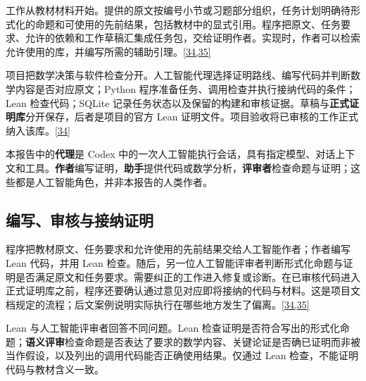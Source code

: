 工作从教材材料开始。提供的原文按编号小节或习题部分组织，任务计划明确待形式化的命题和可使用的先前结果，包括教材中的显式引用。程序把原文、任务要求、允许的依赖和工作草稿汇集成任务包，交给证明作者。实现时，作者可以检索允许使用的库，并编写所需的辅助引理。\hyperlink{ref-34}{\mbox{[34,35]}}

项目把数学决策与软件检查分开。人工智能代理选择证明路线、编写代码并判断数学内容是否对应原文；Python 程序准备任务、调用检查并执行接纳代码的条件；Lean 检查代码；SQLite 记录任务状态以及保留的构建和审核证据。草稿与\textbf{正式证明库}分开保存，后者是项目的官方 Lean 证明文件。项目验收将已审核的工作正式纳入该库。\hyperlink{ref-34}{\mbox{[34]}}

本报告中的\textbf{代理}是 Codex 中的一次人工智能执行会话，具有指定模型、对话上下文和工具。\textbf{作者}编写证明，\textbf{助手}提供代码或数学分析，\textbf{评审者}检查命题与证明；这些都是人工智能角色，并非本报告的人类作者。

\subsection[编写、审核与接纳证明]{\texorpdfstring{\protect\hypertarget{section-1-2}{}编写、审核与接纳证明}{编写、审核与接纳证明}}
程序把教材原文、任务要求和允许使用的先前结果交给人工智能作者；作者编写 Lean 代码，并用 Lean 检查。随后，另一位人工智能评审者判断形式化命题与证明是否满足原文和任务要求。需要纠正的工作进入修复或诊断。在已审核代码进入正式证明库之前，程序还要确认通过意见对应即将接纳的代码与材料。这是项目文档规定的流程；后文案例说明实际执行在哪些地方发生了偏离。\hyperlink{ref-34}{\mbox{[34,35]}}

Lean 与人工智能评审者回答不同问题。Lean 检查证明是否符合写出的形式化命题；\textbf{语义评审}检查命题是否表达了要求的数学内容、关键论证是否确已证明而非被当作假设，以及列出的调用代码能否正确使用结果。仅通过 Lean 检查，不能证明代码与教材含义一致。

